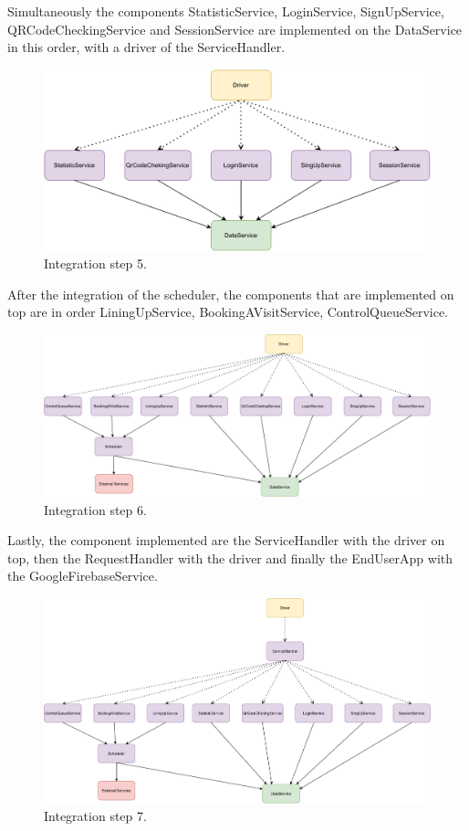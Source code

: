 Simultaneously the components StatisticService, LoginService, SignUpService, QRCodeCheckingService and SessionService are implemented on the DataService in this order, with a driver of the ServiceHandler.

\begin{figure}[H]
    \centering
    \includegraphics[width=1.0\textwidth]{images/component5.pdf}
    \caption{Integration step 5.}
\end{figure}

After the integration of the scheduler, the components that are implemented on top are in order LiningUpService, BookingAVisitService, ControlQueueService.

\begin{figure}[H]
    \centering
    \includegraphics[width=1.0\textwidth]{images/component6.pdf}
    \caption{Integration step 6.}
\end{figure}

Lastly, the component implemented are the ServiceHandler with the driver on top, then the RequestHandler with the driver and finally the EndUserApp with the GoogleFirebaseService.

\begin{figure}[H]
    \centering
    \includegraphics[width=1.0\textwidth]{images/component7.pdf}
    \caption{Integration step 7.}
\end{figure}

